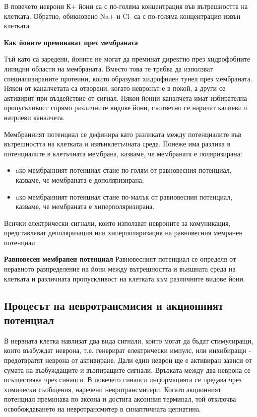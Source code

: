 \documentclass{article}
\numberwithin{equation}{section}
\begin{document}
В повечето неврони К+ йони са с по-голяма концентрация във вътрешността на клетката. Обратно, обикновено Na+ и Cl- са с по-голяма концентрация извън клетката

\vspace{5mm}
\textbf{Как йоните преминават през мембраната}

Тъй като са заредени, йоните не могат да преминат директно през хидрофобните липидни области на мембраната. Вместо това те трябва да
използват специализираните протеини, които образуват хидрофилен тунел през мембраната. Някои от каналчетата са отворени, когато невронът е в
покой, а други се активирит при въздействие от сигнал. Някои йонни каналчета имат избирателна пропускливост спрямо различните видове
йони, съответно се наричат калиеви и натриеви каналчета.

\vspace{5mm} %

Мембранният потенциал се дефинира като разликата между потенциалите във вътрешността на клетката и извънклетъчната среда.
Понеже има разлика в потенциалите в клетъчната мембрана, казваме, че мембраната е поляризирана:
\begin{itemize}
  \item aко мембранният потенциал стане по-голям от равновесния потенциал, казваме, че мембраната е дополяризирана;
  \item aко мембранният потенциал стане по-малък от равновесния потенциал, казваме, че мембраната е хиперполяризирана.
\end{itemize}

Всички електрически сигнали, които използват невроните за комуникация, представляват деполяризация или хиперполяризация на равновесния мемранен потенциал.

\vspace{5mm} %
\textbf{Равновесен мембранен потенциал}
Равновесният потенциал се определя от неравното разпределение на йони между вътрешността и външната среда на клетката и различната пропускливост на клетката към различните видове йони.


\vspace{5mm} %
\subsection{Процесът на невротрансмисия и акционният потенциал}
В нервната клетка навлизат два вида сигнали, които могат да бъдат стимулиращи, които възбуждат неврона, т.е. генерират електрически импулс,
или инхибиращи - предотвратят неврона от активиране.  Дали един неврон ще е активиран зависи от сумата на възбуждащите и възпиращите
сигнали.  Връзката между два неврона се осъществява чрез синапси. В повечето синапси информацията се предава чрез химически съобщения,
наречени невротрансмитери. Когато акционният потенциал преминава по аксона и достига аксонния терминал, той отключва освобождаването на
невротрансмитер в синаптичната цепнатина.
\end{document}
